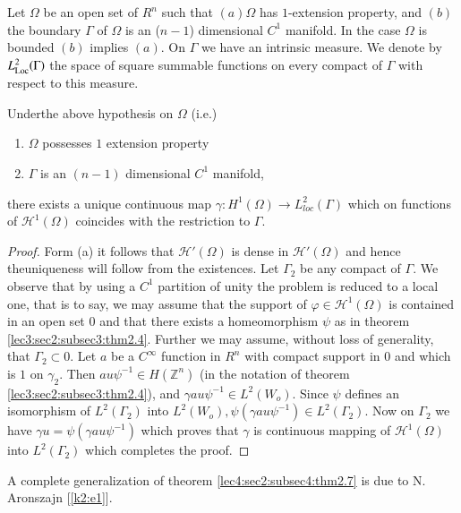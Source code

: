 Let $\Omega$ be an open set of $R^n$ such
that $(a)\Omega$ has 
$1$-extension property, and $(b)$ the boundary $\Gamma$ of $\Omega$ is
an ($n -1$) dimensional $C^1$ manifold. In the case $\Omega$ is
bounded $(b)$ implies $(a)$. On $\Gamma$ we have an intrinsic
measure. We denote by $L^2_{\operatorname{Loc}}(\Gamma)$ the space of square summable
functions on every compact of $\Gamma$ with respect to this measure. 

\begin{theorem}\label{lec4:sec2:subsec5:thm2.9}%
Under\pageoriginale the above hypothesis on $\Omega$ (i.e.)
   \begin{enumerate}[\rm a)]
      \item $\Omega$ possesses $1$ extension property
      \item $\Gamma$ is an $(n -1)$ dimensional $C^1$ manifold,
   \end{enumerate}
there exists a unique continuous map $\gamma : H^1 (\Omega)
\rightarrow L^2_{loc}(\Gamma)$ which on functions of $\mathscr{H}^{1}
(\Omega)$ coincides with the restriction to $\Gamma$. 
\end{theorem}

\begin{proof}
Form (a) it follows that $\mathscr{H}'(\Omega)$ is dense in
$\mathscr{H}' (\Omega)$ and hence the\break uniqueness will follow from the
existences. Let $\Gamma_2$ be any compact of $\Gamma$. We observe that
by using a $C^1$ partition of unity the problem is reduced to a local
one, that is to say, we may assume that the support of $\varphi
\in \mathscr{H}^1(\Omega)$ is contained in an open set $0$ and
that there exists a homeomorphism $\psi$ as in theorem \ref{lec3:sec2:subsec3:thm2.4}. Further
we may assume, without loss of generality, that $\Gamma_2 \subset
0$. Let $a$ be a $C^\infty$ function in $R^n$ with compact support in
$0$ and which is $1$ on $\gamma_2$. Then $au \psi^{-1} \in
H(\mathbb{Z}^n)$ (in the notation of theorem \ref{lec3:sec2:subsec3:thm2.4}), and $\gamma au
\psi^{-1} \in L^2(W_o)$. Since $\psi$ defines an isomorphism
of $L^2 (\Gamma_2)$ into $L^2(W_o), \psi (\gamma a u \psi^{-1})
\in L^2(\Gamma_2)$. Now on $\Gamma_2$ we have $\gamma u =
\psi(\gamma au \psi^{-1})$ which proves that $\gamma$ is continuous
mapping of $\mathscr{H}^1(\Omega)$ into $L^2(\Gamma_2)$ which
completes the proof. 
\end{proof}

\begin{remark*}
  A complete generalization of theorem \ref{lec4:sec2:subsec4:thm2.7} is due to N. Aronszajn [\ref{k2:e1}].
\end{remark*}
